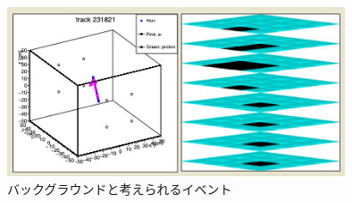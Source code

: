 \begin{figure}[H]
    \centering
    \includegraphics[height=5.0cm]{img/anal_bg01.png}
    \caption{バックグラウンドと考えられるイベント}
    \label{fig:anal:bg01}
\end{figure}